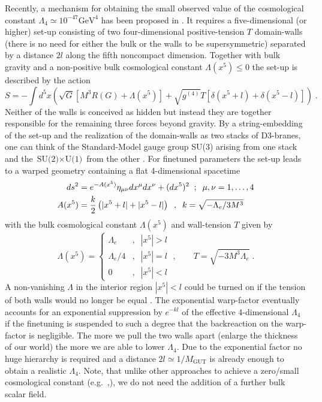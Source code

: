 \documentclass[a4paper,12pt]{article}
\begin{document}
Recently, a mechanism for obtaining the small observed value of the
cosmological constant $\Lambda_4 \simeq 10^{-47}\text{GeV}^4$ has been
proposed in \cite{AK3}. It requires a five-dimensional (or higher)
set-up consisting of two four-dimensional positive-tension $T$
domain-walls (there is no need for either the bulk or the walls to be
supersymmetric) separated by a distance $2l$ along the fifth noncompact
dimension. Together with bulk gravity and a non-positive bulk
cosmological constant $\Lambda(x^5)\le 0$ the set-up is described by
the action
\begin{equation}
  S=-\int d^5x \left( \sqrt{G}\left[ M^3R(G)+\Lambda(x^5) \right]
                     +\sqrt{g^{(4)}}T\left[ \delta(x^5+l)+\delta(x^5-l)
                                     \right]
               \right) \; .
  \label{WallAction}
\end{equation}
Neither of the walls is conceived as hidden but instead they are
together responsible for the remaining three forces beyond gravity. By
a string-embedding of the set-up and the realization of the
domain-walls as two stacks of D3-branes, one can think of the
Standard-Model gauge group SU(3) arising from one stack and the
$\text{SU(2)}\times\text{U(1)}$ from the other \cite{AK3}. For
finetuned parameters the set-up leads to a warped geometry containing
a flat 4-dimensional spacetime
\begin{alignat}{3}
  ds^2 &= e^{-A(x^5)}\eta_{\mu\nu}dx^\mu dx^\nu + (dx^5)^2 \;\; ; \;\;
                            \mu,\nu=1,\hdots,4 \notag \\
  A(x^5) &= \frac{k}{2}
            \left( |x^5+l|+|x^5-l| \right) \;\; , \;\;
  k = \sqrt{-\Lambda_e/3M^3}
  \label{FlatSolution}
\end{alignat}
with the bulk cosmological constant $\Lambda(x^5)$ and wall-tension $T$ given
by
\begin{equation}
  \Lambda(x^5) = 
            \left\{ \begin{array}{cc}
      \Lambda_e   &, \;\;|x^5| > l \\
      \Lambda_e/4 &, \;\;|x^5| = l \\
          0       &, \;\;|x^5| < l
                    \end{array}
            \right.   
  \; , \qquad   
  T=\sqrt{-3M^3 \Lambda_e} \; . 
  \label{Tension}
\end{equation}
A non-vanishing $\Lambda$ in the interior region $|x^5|<l$ could be
turned on if the tension of both walls would no longer be equal
\cite{AK3}.  The exponential warp-factor eventually accounts for an
exponential suppression by $e^{-kl}$ of the effective 4-dimensional
$\Lambda_4$ if the finetuning is suspended to such a degree that the
backreaction on the warp-factor is negligible. The more we pull the
two walls apart (enlarge the thickness of our world) the
more we are able to lower $\Lambda_4$. Due to the exponential factor
no huge hierarchy is required and a distance $2l\simeq
1/M_{\text{GUT}}$ is already enough to obtain a realistic $\Lambda_4$.
Note, that unlike other approaches to achieve a zero/small
cosmological constant (e.g.~\cite{ADKS},\cite{KSS}), we do not need
the addition of a further bulk scalar field.
\end{document}
